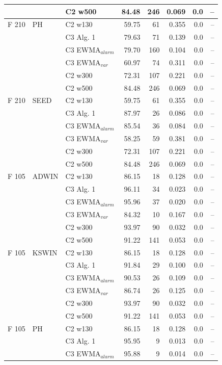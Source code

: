 \begin{longtable}{lllrrrrr}
 &  & C2 w500 & 84.48 & 246 & 0.069 & 0.0 & -- \\
\hline
F  210 & PH & C2 w130 & 59.75 & 61 & 0.355 & 0.0 & -- \\
 &  & C3 Alg. 1 & 79.63 & 71 & 0.139 & 0.0 & -- \\
 &  & C3 EWMA$_{alarm}$ & 79.70 & 160 & 0.104 & 0.0 & -- \\
 &  & C3 EWMA$_{var}$ & 60.97 & 74 & 0.311 & 0.0 & -- \\
 &  & C2 w300 & 72.31 & 107 & 0.221 & 0.0 & -- \\
 &  & C2 w500 & 84.48 & 246 & 0.069 & 0.0 & -- \\
\hline
F  210 & SEED & C2 w130 & 59.75 & 61 & 0.355 & 0.0 & -- \\
 &  & C3 Alg. 1 & 87.97 & 26 & 0.086 & 0.0 & -- \\
 &  & C3 EWMA$_{alarm}$ & 85.54 & 36 & 0.084 & 0.0 & -- \\
 &  & C3 EWMA$_{var}$ & 58.25 & 59 & 0.381 & 0.0 & -- \\
 &  & C2 w300 & 72.31 & 107 & 0.221 & 0.0 & -- \\
 &  & C2 w500 & 84.48 & 246 & 0.069 & 0.0 & -- \\
\hline
F  105 & ADWIN & C2 w130 & 86.15 & 18 & 0.128 & 0.0 & -- \\
 &  & C3 Alg. 1 & 96.11 & 34 & 0.023 & 0.0 & -- \\
 &  & C3 EWMA$_{alarm}$ & 95.96 & 37 & 0.020 & 0.0 & -- \\
 &  & C3 EWMA$_{var}$ & 84.32 & 10 & 0.167 & 0.0 & -- \\
 &  & C2 w300 & 93.97 & 90 & 0.032 & 0.0 & -- \\
 &  & C2 w500 & 91.22 & 141 & 0.053 & 0.0 & -- \\
\hline
F  105 & KSWIN & C2 w130 & 86.15 & 18 & 0.128 & 0.0 & -- \\
 &  & C3 Alg. 1 & 91.84 & 29 & 0.100 & 0.0 & -- \\
 &  & C3 EWMA$_{alarm}$ & 90.53 & 26 & 0.109 & 0.0 & -- \\
 &  & C3 EWMA$_{var}$ & 86.74 & 26 & 0.125 & 0.0 & -- \\
 &  & C2 w300 & 93.97 & 90 & 0.032 & 0.0 & -- \\
 &  & C2 w500 & 91.22 & 141 & 0.053 & 0.0 & -- \\
\hline
F  105 & PH & C2 w130 & 86.15 & 18 & 0.128 & 0.0 & -- \\
 &  & C3 Alg. 1 & 95.95 & 9 & 0.013 & 0.0 & -- \\
 &  & C3 EWMA$_{alarm}$ & 95.88 & 9 & 0.014 & 0.0 & -- \\

\end{longtable}
